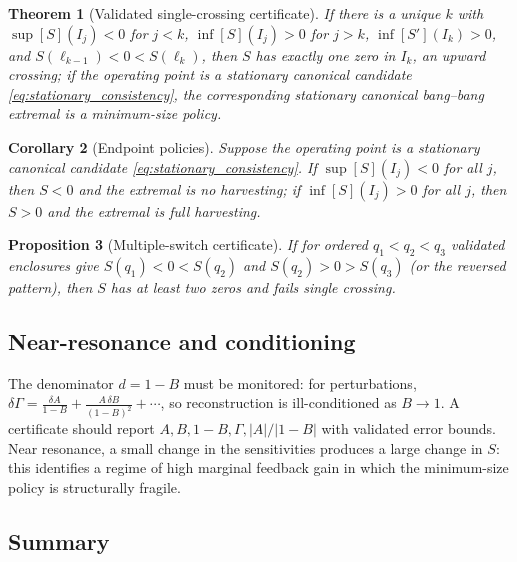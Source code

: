 \documentclass[pdflatex,sn-mathphys-num]{sn-jnl}
\theoremstyle{plain}
\newtheorem{theorem}{Theorem}[section]
\newtheorem{proposition}[theorem]{Proposition}
\newtheorem{corollary}[theorem]{Corollary}
\theoremstyle{definition}
\theoremstyle{remark}
\begin{document}
\begin{theorem}[Validated single-crossing certificate]
\label{thm:validated_certificate}
If there is a unique $k$ with $\sup[S](I_j)<0$ for $j<k$, $\inf[S](I_j)>0$ for
$j>k$, $\inf[S'](I_k)>0$, and $S(\ell_{k-1})<0<S(\ell_k)$, then $S$ has exactly one
zero in $I_k$, an upward crossing; if the operating point is a stationary
canonical candidate \eqref{eq:stationary_consistency}, the corresponding
stationary canonical bang--bang extremal is a minimum-size policy.
\end{theorem}

\begin{corollary}[Endpoint policies]
\label{cor:validated_endpoint_policies}
Suppose the operating point is a stationary canonical candidate
\eqref{eq:stationary_consistency}. If $\sup[S](I_j)<0$ for all $j$, then $S<0$ and
the extremal is no harvesting; if $\inf[S](I_j)>0$ for all $j$, then $S>0$ and the
extremal is full harvesting.
\end{corollary}

\begin{proposition}[Multiple-switch certificate]
\label{prop:validated_multiple_switch}
If for ordered $q_1<q_2<q_3$ validated enclosures give
$S(q_1)<0<S(q_2)$ and $S(q_2)>0>S(q_3)$ (or the reversed pattern), then $S$ has at
least two zeros and fails single crossing.
\end{proposition}

\subsection{Near-resonance and conditioning}
\label{subsec:near_resonance}

The denominator $d=1-B$ must be monitored: for perturbations,
$\displaystyle \delta\Gamma=\frac{\delta A}{1-B}+\frac{A\,\delta B}{(1-B)^2}+\cdots$,
so reconstruction is ill-conditioned as $B\to1$. A certificate should report
$A,B,1-B,\Gamma,|A|/|1-B|$ with validated error bounds. Near resonance, a small
change in the sensitivities produces a large change in $S$: this identifies a
regime of high marginal feedback gain in which the minimum-size policy is
structurally fragile.

\subsection{Summary}
\label{subsec:stationary_correction_summary}
\end{document}
